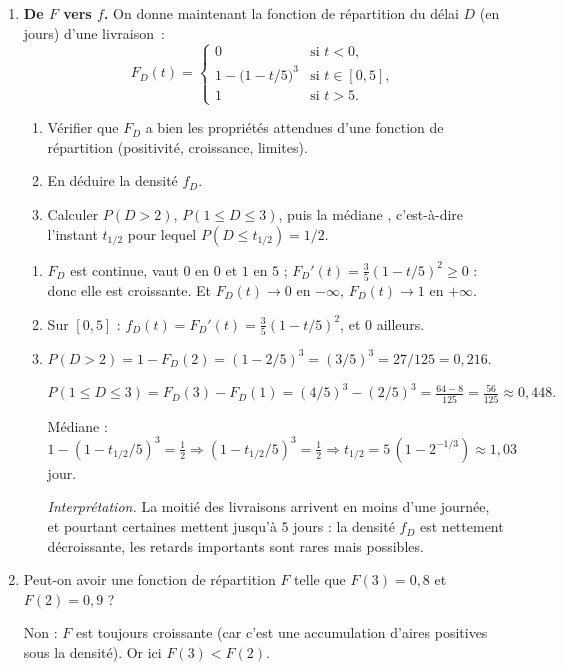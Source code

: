 \begin{enumerate}
  \item \textbf{De $F$ vers $f$.}
  On donne maintenant la fonction de répartition
  du délai $D$ (en jours) d'une livraison~:
  \[
    F_D(t)=
    \begin{cases}
      0 & \text{si } t<0,\\
      1-\bigl(1-t/5\bigr)^3 & \text{si } t\in[0,5],\\
      1 & \text{si } t>5.
    \end{cases}
  \]
  \begin{enumerate}
    \item Vérifier que $F_D$ a bien les propriétés attendues
    d'une fonction de répartition (positivité, croissance, limites).
    \item En déduire la densité $f_D$.
    \item Calculer $P(D>2)$, $P(1\le D\le 3)$,
    puis la \og médiane \fg, c'est-à-dire l'instant $t_{1/2}$ pour lequel
    $P(D\le t_{1/2})=1/2$.
  \end{enumerate}
  \begin{solution}
    \begin{enumerate}
    \item $F_D$ est continue, vaut $0$ en $0$ et $1$ en $5$ ;
    $F_D'(t)=\tfrac{3}{5}(1-t/5)^2\ge 0$ : donc elle est croissante.
    Et $F_D(t)\to 0$ en $-\infty$, $F_D(t)\to 1$ en $+\infty$. \checkmark

    \item Sur $[0,5]$ :
    $f_D(t)=F_D'(t)=\tfrac{3}{5}(1-t/5)^2$, et $0$ ailleurs.

    \item $P(D>2)=1-F_D(2)=(1-2/5)^3=(3/5)^3=27/125=0{,}216$.

    $P(1\le D\le 3)=F_D(3)-F_D(1)=(4/5)^3-(2/5)^3
    =\tfrac{64-8}{125}=\tfrac{56}{125}\approx 0{,}448.$

    Médiane : $1-(1-t_{1/2}/5)^3=\tfrac{1}{2}
    \Rightarrow (1-t_{1/2}/5)^3=\tfrac{1}{2}
    \Rightarrow t_{1/2}=5\,(1-2^{-1/3})\approx 1{,}03$ jour.

    \textit{Interprétation.} La moitié des livraisons arrivent
    en moins d'une journée, et pourtant certaines mettent jusqu'à
    $5$ jours : la densité $f_D$ est nettement décroissante,
    les retards importants sont rares mais possibles.
    \end{enumerate}
  \end{solution}

  \item 
  Peut-on avoir une fonction de répartition $F$ telle que $F(3)=0{,}8$
  et $F(2)=0{,}9$ ?
  \begin{solution}
    Non : $F$ est toujours croissante (car c'est une accumulation
    d'aires positives sous la densité). Or ici $F(3)<F(2)$.
  \end{solution}
\end{enumerate}

